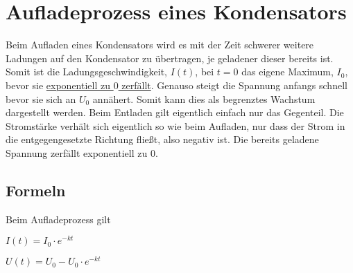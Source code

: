 \documentclass{article}
\begin{document}
\section{Aufladeprozess eines Kondensators}
Beim Aufladen eines Kondensators wird es mit der Zeit schwerer weitere Ladungen auf den Kondensator zu übertragen, je geladener dieser bereits ist. Somit ist die Ladungsgeschwindigkeit, $I(t)$, bei $t=0$ das eigene Maximum, $I_0$, bevor sie \hyperref[Wachstumsfunktionen]{exponentiell zu $0$ zerfällt}. Genauso steigt die Spannung anfangs schnell bevor sie sich an $U_0$ annähert. Somit kann dies als begrenztes Wachstum dargestellt werden. \newline
Beim Entladen gilt eigentlich einfach nur das Gegenteil. Die Stromstärke verhält sich eigentlich so wie beim Aufladen, nur dass der Strom in die entgegengesetzte Richtung fließt, also negativ ist. Die bereits geladene Spannung zerfällt exponentiell zu $0$.
 
\subsection{Formeln}
Beim Aufladeprozess gilt \newline 
\begin{minipage}{0.5\linewidth}
 \center
 $I(t)=I_0 \cdot e^{-kt}$
 
\end{minipage}
\hfill
\begin{minipage}{0.5\linewidth}
 \center
 $U(t)=U_0 - U_0 \cdot e^{-kt}$
 
\end{minipage} 
 
\end{document}
